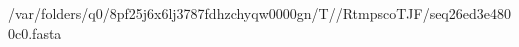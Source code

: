 \documentclass[10pt]{article}
\begin{document}
\begin{texshade}{/var/folders/q0/8pf25j6x6lj3787fdhzchyqw0000gn/T//RtmpscoTJF/seq26ed3e4800c0.fasta}
\hidelogoscale
{}
\showlegend
\end{texshade}
\end{document}
